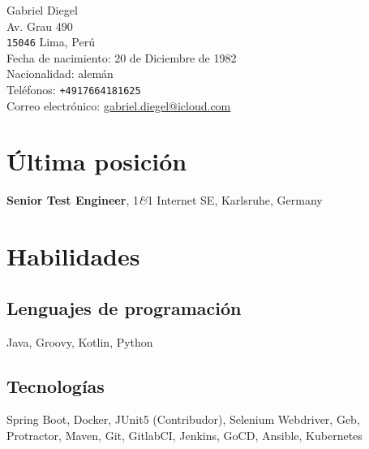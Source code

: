 \documentclass[10pt, a4paper]{article}
\newcommand{\amper}{{\fontspec[Scale=.95]{Fontin}\selectfont\itshape\&}}
\begin{document}
{\LARGE Gabriel Diegel}\\[1cm]
Av. Grau 490\\
\texttt{15046} Lima, Perú\\[.2cm]
Fecha de nacimiento: 20 de Diciembre de 1982\\
Nacionalidad: alemán\\[.2cm]
Teléfonos: \texttt{+4917664181625}\\
Correo electrónico: \href{mailto:gabriel.diegel@icloud.com}{gabriel.diegel@icloud.com}\\

\section*{Última posición}
{\bf Senior Test Engineer}, 1\amper{}1 Internet SE, Karlsruhe, Germany

\section*{Habilidades}
\subsection*{Lenguajes de programación}
Java, Groovy, Kotlin, Python
\subsection*{Tecnologías}
Spring Boot, Docker, JUnit5 (Contribudor), Selenium Webdriver, Geb, Protractor, Maven, Git, GitlabCI, Jenkins, GoCD, Ansible, Kubernetes

\end{document}
